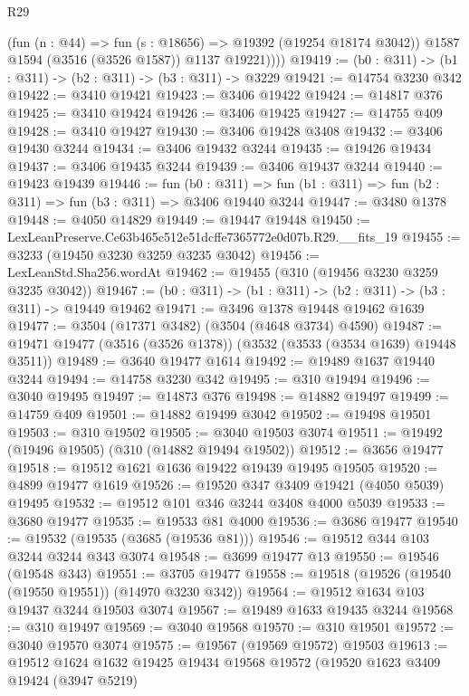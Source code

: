 \begin{lexlean}{R29}
\begin{coremodule}
            (fun (n : @44) => fun (s : @18656) => @19392 (@19254 @18174 @3042))
            @1587
            @1594
            (@3516 (@3526 @1587))
            @1137
            @19221))))
@19419 := (b0 : @311) -> (b1 : @311) -> (b2 : @311) -> (b3 : @311) -> @3229
@19421 := @14754 @3230 @342
@19422 := @3410 @19421
@19423 := @3406 @19422
@19424 := @14817 @376
@19425 := @3410 @19424
@19426 := @3406 @19425
@19427 := @14755 @409
@19428 := @3410 @19427
@19430 := @3406 @19428 @3408
@19432 := @3406 @19430 @3244
@19434 := @3406 @19432 @3244
@19435 := @19426 @19434
@19437 := @3406 @19435 @3244
@19439 := @3406 @19437 @3244
@19440 := @19423 @19439
@19446 := fun (b0 : @311) =>
  fun (b1 : @311) => fun (b2 : @311) => fun (b3 : @311) => @3406 @19440 @3244
@19447 := @3480 @1378
@19448 := @4050 @14829
@19449 := @19447 @19448
@19450 := LexLeanPreserve.Ce63b465c512e51dcffe7365772e0d07b.R29.__fits_19
@19455 := @3233 (@19450 @3230 @3259 @3235 @3042)
@19456 := LexLeanStd.Sha256.wordAt
@19462 := @19455 (@310 (@19456 @3230 @3259 @3235 @3042))
@19467 := (b0 : @311) -> (b1 : @311) -> (b2 : @311) -> (b3 : @311) -> @19449 @19462
@19471 := @3496 @1378 @19448 @19462 @1639
@19477 := @3504 (@17371 @3482) (@3504 (@4648 @3734) @4590)
@19487 := @19471 @19477 (@3516 (@3526 @1378)) (@3532 (@3533 (@3534 @1639) @19448 @3511))
@19489 := @3640 @19477 @1614
@19492 := @19489 @1637 @19440 @3244
@19494 := @14758 @3230 @342
@19495 := @310 @19494
@19496 := @3040 @19495
@19497 := @14873 @376
@19498 := @14882 @19497
@19499 := @14759 @409
@19501 := @14882 @19499 @3042
@19502 := @19498 @19501
@19503 := @310 @19502
@19505 := @3040 @19503 @3074
@19511 := @19492 (@19496 @19505) (@310 (@14882 @19494 @19502))
@19512 := @3656 @19477
@19518 := @19512 @1621 @1636 @19422 @19439 @19495 @19505
@19520 := @4899 @19477 @1619
@19526 := @19520 @347 @3409 @19421 (@4050 @5039) @19495
@19532 := @19512 @101 @346 @3244 @3408 @4000 @5039
@19533 := @3680 @19477
@19535 := @19533 @81 @4000
@19536 := @3686 @19477
@19540 := @19532 (@19535 (@3685 (@19536 @81)))
@19546 := @19512 @344 @103 @3244 @3244 @343 @3074
@19548 := @3699 @19477 @13
@19550 := @19546 (@19548 @343)
@19551 := @3705 @19477
@19558 := @19518 (@19526 (@19540 (@19550 @19551)) (@14970 @3230 @342))
@19564 := @19512 @1634 @103 @19437 @3244 @19503 @3074
@19567 := @19489 @1633 @19435 @3244
@19568 := @310 @19497
@19569 := @3040 @19568
@19570 := @310 @19501
@19572 := @3040 @19570 @3074
@19575 := @19567 (@19569 @19572) @19503
@19613 := @19512
    @1624
    @1632
    @19425
    @19434
    @19568
    @19572
    (@19520
      @1623
      @3409
      @19424
      (@3947 @5219)

\end{coremodule}
\end{lexlean}
